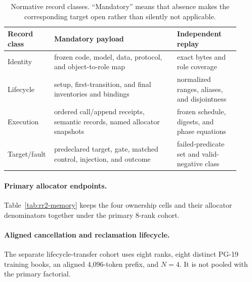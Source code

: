 \documentclass{article}
\begin{document}
\begin{table}[H]
  \caption{Normative record classes.  ``Mandatory'' means that absence makes
  the corresponding target open rather than silently not applicable.}
  \label{tab:normative-records}
  \centering\footnotesize
  \begin{tabular}{@{}p{0.14\linewidth}p{0.51\linewidth}p{0.26\linewidth}@{}}
    \toprule
    Record class & Mandatory payload & Independent replay \tabularnewline
    \midrule
    Identity & frozen code, model, data, protocol, and object-to-role map & exact bytes and role coverage \\
    Lifecycle & setup, first-transition, and final inventories and bindings & normalized ranges, aliases, and disjointness \\
    Execution & ordered call/append receipts, semantic records, named allocator snapshots & frozen schedule, digests, and phase equations \\
    Target/fault & predeclared target, gate, matched control, injection, and outcome & failed-predicate set and valid-negative class \\
    \bottomrule
  \end{tabular}
\end{table}

\paragraph{Primary allocator endpoints.}
Table~\ref{tab:rr2-memory} keeps the four ownership cells and their allocator
denominators together under the primary 8-rank cohort.


\paragraph{Aligned cancellation and reclamation lifecycle.}
The separate lifecycle-transfer cohort uses eight ranks, eight distinct PG-19
training books, an aligned 4,096-token prefix, and $N=4$.  It is not pooled
with the primary factorial.
\end{document}

